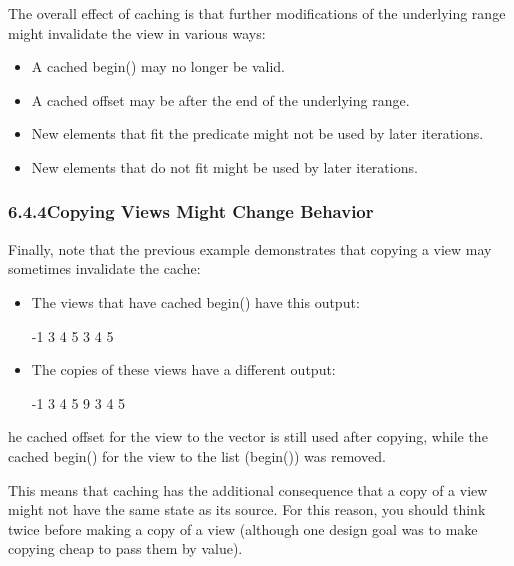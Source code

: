 The overall effect of caching is that further modifications of the underlying range might invalidate the view in various ways:

\begin{itemize}
\item
A cached begin() may no longer be valid.

\item
A cached offset may be after the end of the underlying range.

\item
New elements that fit the predicate might not be used by later iterations.

\item
New elements that do not fit might be used by later iterations.
\end{itemize}

\subsubsection*{ 6.4.4\hspace{0.2cm}Copying Views Might Change Behavior}

Finally, note that the previous example demonstrates that copying a view may sometimes invalidate the cache:

\begin{itemize}
\item
The views that have cached begin() have this output:

{\footnotesize
\begin{shell}
-1 3 4 5
3 4 5
\end{shell}
}

\item
The copies of these views have a different output:

{\footnotesize
\begin{shell}
-1 3 4 5
9 3 4 5
\end{shell}
}
\end{itemize}

he cached offset for the view to the vector is still used after copying, while the cached begin() for the view to the list (begin()) was removed.

This means that caching has the additional consequence that a copy of a view might not have the same state as its source. For this reason, you should think twice before making a copy of a view (although one design goal was to make copying cheap to pass them by value).


